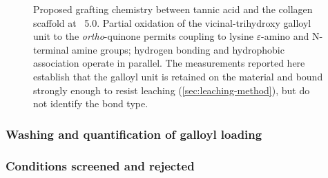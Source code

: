 \begin{figure}[htbp]
  \centering
  \caption[Proposed tannic acid--collagen grafting chemistry]{Proposed grafting chemistry between tannic acid and the collagen scaffold at \pH~5.0. Partial oxidation of the vicinal-trihydroxy galloyl unit to the \textit{ortho}-quinone permits coupling to lysine $\varepsilon$-amino and N-terminal amine groups; hydrogen bonding and hydrophobic association operate in parallel. The measurements reported here establish that the galloyl unit is retained on the material and bound strongly enough to resist leaching (\cref{sec:leaching-method}), but do not identify the bond type.}
  \label{fig:grafting-scheme}
\end{figure}

\subsubsection{Washing and quantification of galloyl loading}
\label{sec:loading}
%

\subsubsection{Conditions screened and rejected}
\label{sec:failed-conditions}

